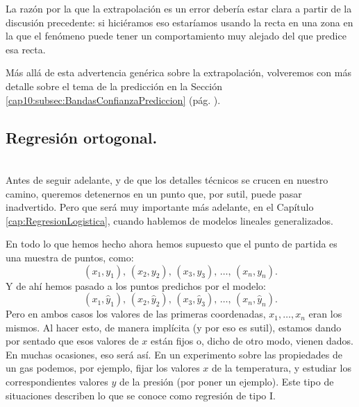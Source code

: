    \begin{center}
    \end{center}
La razón por la que la extrapolación es un error debería estar clara a partir de la discusión precedente: si hiciéramos eso estaríamos usando la recta en una zona en la que el fenómeno puede tener un comportamiento muy alejado del que predice esa recta.

Más allá de esta advertencia genérica sobre la extrapolación, volveremos con más detalle sobre el tema de la predicción en la Sección \ref{cap10:subsec:BandasConfianzaPrediccion} (pág. \pageref{cap10:subsec:BandasConfianzaPrediccion}).

\subsection{Regresión ortogonal.}
\label{cap10:subsec:RegresionOrtogonal}
\\

Antes de seguir adelante, y de que los detalles técnicos se crucen en nuestro camino, queremos detenernos en un punto que, por sutil, puede pasar inadvertido. Pero que será muy importante más adelante, en el Capítulo \ref{cap:RegresionLogistica}, cuando hablemos de modelos lineales generalizados.

En todo lo que hemos hecho ahora hemos supuesto que el punto de partida es una muestra de puntos, como:
\[(x_1, y_1),\, (x_2, y_2),\, (x_3, y_3),\, \ldots,\, (x_n, y_n).\]
Y de ahí hemos pasado a los puntos predichos por el modelo:
\[(x_1, \hat y_1),\, (x_2,\hat y_2),\, (x_3, \hat y_3),\, \ldots,\, (x_n, \hat y_n).\]
Pero en ambos casos los valores de las primeras coordenadas, $x_1, \ldots, x_n$ eran los mismos. Al hacer esto, de manera implícita (y por eso es sutil), estamos dando por sentado que esos valores de $x$ están fijos o, dicho de otro modo, vienen dados. En muchas ocasiones, eso será así. En un experimento sobre las propiedades de un gas podemos, por ejemplo, fijar los valores $x$ de la temperatura, y estudiar los correspondientes valores $y$ de la presión (por poner un ejemplo). Este tipo de situaciones describen lo que se conoce como {\sf regresión de tipo I}.


